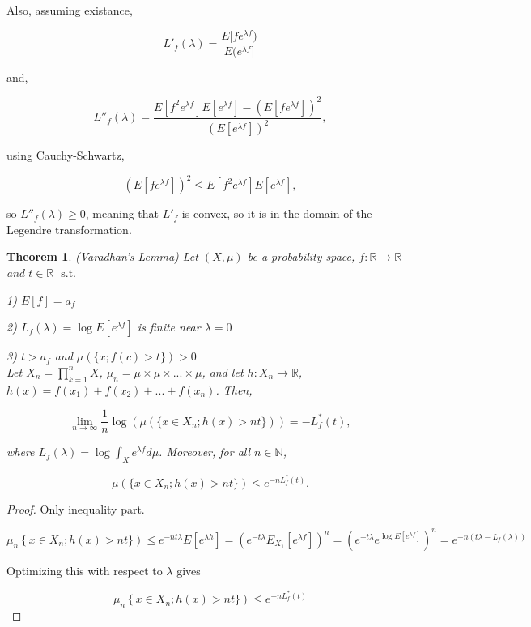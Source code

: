 \documentclass[12pt]{article}
\newtheorem{thm}{Theorem}[section]
\theoremstyle{remark}
\newcommand{\nats}[0] { \mathbb{N}}
\newcommand{\reals}[0] { \mathbb{R}}
\newcommand{\st}[0]{ \; \textrm{s.t.} \; }
\newcommand{\rarw}[0] { \rightarrow }
\begin{document}
Also, assuming existance,

$$
L'_f(\lambda) = \frac{E[f e^{\lambda f})}{E(e^{\lambda f }]}
$$

and,

$$
L''_f(\lambda) = \frac{ E[f^2 e^{\lambda f}]E[e^{\lambda f}]-(E[f e^{\lambda f}])^2 }{ (E[e^{\lambda f }])^2 },
$$

using Cauchy-Schwartz,

$$
(E[f e^{\lambda f}])^2  \le E[f^2 e^{\lambda f}] E[ e^{\lambda f}] ,
$$

so $L''_f(\lambda) \ge 0$, meaning that $L'_f$ is convex, so it is in the domain of the Legendre transformation.


\begin{thm} (Varadhan's Lemma) 
Let $(X, \mu)$ be a probability space, $f:\reals \rarw \reals$ and $t \in \reals$ $\st$

1) $E[f] = a_f$

2) $L_f(\lambda) = \log E[ e^{\lambda f}]$ is finite near $\lambda = 0$

3) $t>a_f$ and $\mu( \{ x; f(c) > t\})>0$\\

Let $X_n = \prod_{k=1}^n X$, $\mu_n = \mu \times \mu \times ... \times \mu$, and let $h: X_n \rarw \reals$, $h(x) = f(x_1) + f(x_2) + ... + f(x_n)$. Then,

$$
\lim_{n \rarw \infty} \frac{1}{n} \log \left( \mu \left( \{ x \in X_n; h(x) > n t \} \right) \right) = - L^*_f(t),
$$

where $L_f(\lambda) = \log \int_X e^{ \lambda f} d \mu$. Moreover, for all $n \in \nats$, 

$$
\mu \left( \{ x \in X_n; h(x) > n t \} \right) \le e^{ -n L^*_f(t) }.
$$

\end{thm}


\begin{proof} 

Only inequality part.

$$
\mu_n \left \{ x \in X_n; h(x) > n t\} \right) \le e^{ -n t \lambda} E[e^{\lambda h}] = \left(  e^{-t \lambda} E_{X_1} [ e^{\lambda f}] \right)^n =
 \left(  e^{-t \lambda} e^{\log E[ e^{\lambda f}]} \right)^n =   e^{ -n( t \lambda  -L_f(\lambda))} 
$$

Optimizing this with respect to $\lambda$ gives 

$$
\mu_n \left \{ x \in X_n; h(x) > n t\} \right)  \le e^{ -n L^*_f(t)  } 
$$
    
\end{proof}
\end{document}
